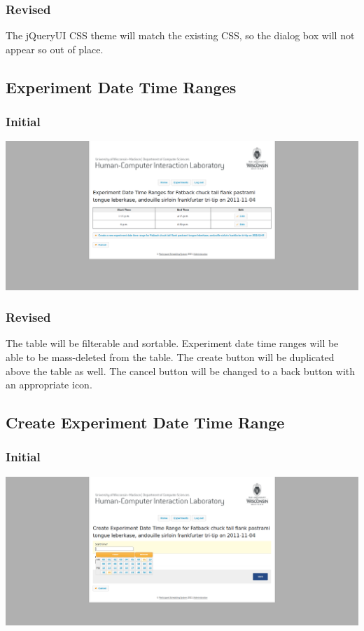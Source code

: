 \subsubsection{Revised}
The jQueryUI CSS theme will match the existing CSS, so the dialog box will not appear so out of place.

\subsection{Experiment Date Time Ranges}
\subsubsection{Initial}
\includegraphics[width=6in]{../other/initial-interface-design/experiment-date-time-ranges.png}
\subsubsection{Revised}
The table will be filterable and sortable. Experiment date time ranges will be able to be mass-deleted from the table. The create button will be duplicated above the table as well. The cancel button will be changed to a back button with an appropriate icon.

\subsection{Create Experiment Date Time Range}
\subsubsection{Initial}
\includegraphics[width=6in]{../other/initial-interface-design/create-experiment-date-time-range.png}
